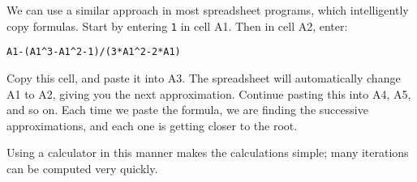 We can use a similar approach in most spreadsheet programs, which intelligently copy formulas.  Start by entering \verb+1+ in cell A1.  Then in cell A2, enter:
\begin{center}
\verb+A1-(A1^3-A1^2-1)/(3*A1^2-2*A1)+
\end{center}
Copy this cell, and paste it into A3.  The spreadsheet will automatically change A1 to A2, giving you the next approximation.  Continue pasting this into A4, A5, and so on.  Each time we paste the formula, we are finding the successive approximations, and each one is getting closer to the root.

Using a calculator in this manner makes the calculations simple; many iterations can be computed very quickly. \\


